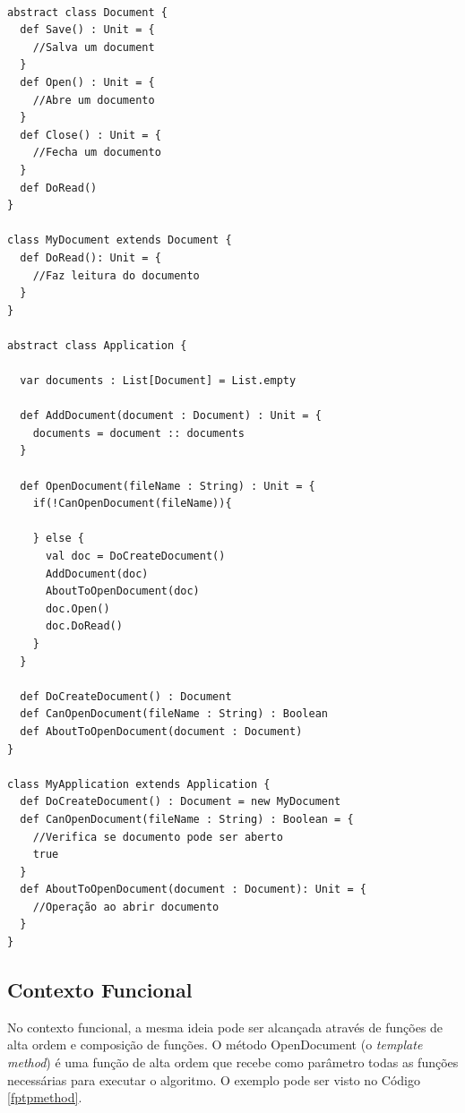 \begin{lstlisting}[caption={Template Method Orientação a Objetos.},label=ootpmethod]

abstract class Document {
  def Save() : Unit = {
    //Salva um document
  }
  def Open() : Unit = {
    //Abre um documento
  }
  def Close() : Unit = {
    //Fecha um documento
  }
  def DoRead()
}

class MyDocument extends Document {
  def DoRead(): Unit = {
    //Faz leitura do documento
  }
}

abstract class Application {

  var documents : List[Document] = List.empty

  def AddDocument(document : Document) : Unit = {
    documents = document :: documents
  }

  def OpenDocument(fileName : String) : Unit = {
    if(!CanOpenDocument(fileName)){

    } else {
      val doc = DoCreateDocument()
      AddDocument(doc)
      AboutToOpenDocument(doc)
      doc.Open()
      doc.DoRead()
    }
  }

  def DoCreateDocument() : Document
  def CanOpenDocument(fileName : String) : Boolean
  def AboutToOpenDocument(document : Document)
}

class MyApplication extends Application {
  def DoCreateDocument() : Document = new MyDocument
  def CanOpenDocument(fileName : String) : Boolean = {
    //Verifica se documento pode ser aberto
    true
  }
  def AboutToOpenDocument(document : Document): Unit = {
    //Operação ao abrir documento
  }
}

\end{lstlisting}

\subsection*{Contexto Funcional}

No contexto funcional, a mesma ideia pode ser alcançada 
através de funções de alta ordem e composição de funções. 
O método OpenDocument (o \textit{template method}) é 
uma função de alta ordem que recebe como parâmetro todas 
as funções necessárias para executar o algoritmo. 
O exemplo pode ser visto no Código \ref{fptpmethod}.

